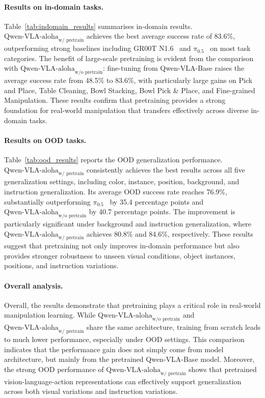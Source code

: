 \documentclass{article}
\begin{document}
    \paragraph{Results on in-domain tasks.}
        Table~\ref{tab:indomain_results} summarises in-domain results.
    ${\text{Qwen-VLA-aloha}}_{\text{w/ pretrain}}$ achieves the best average success rate of 83.6\%, outperforming strong baselines including GR00T N1.6~\citep{nvidia2025gr00t} and $\pi_{0.5}$~\citep{black2025pi05} on most task categories.
    The benefit of large-scale pretraining is evident from the comparison with
    ${\text{Qwen-VLA-aloha}}_{\text{w/o pretrain}}$:
    fine-tuning from Qwen-VLA-Base raises the average success rate from 48.5\% to 83.6\%, with particularly large gains on Pick and Place, Table Cleaning, Bowl Stacking, Bowl Pick \& Place, and Fine-grained Manipulation.
    These results confirm that pretraining provides a strong foundation for real-world manipulation that transfers effectively across diverse in-domain tasks.

    
    
    \paragraph{Results on OOD tasks.}
    Table~\ref{tab:ood_results} reports the OOD generalization performance. ${\text{Qwen-VLA-aloha}}_{\text{w/ pretrain}}$ consistently achieves the best results across all five generalization settings, including color, instance, position, background, and instruction generalization. Its average OOD success rate reaches 76.9\%, substantially outperforming $\pi_{0.5}$~\citep{black2025pi05} by 35.4 percentage points and ${\text{Qwen-VLA-aloha}}_{\text{w/o pretrain}}$ by 40.7 percentage points. The improvement is particularly significant under background and instruction generalization, where ${\text{Qwen-VLA-aloha}}_{\text{w/ pretrain}}$ achieves 80.8\% and 84.6\%, respectively. These results suggest that pretraining not only improves in-domain performance but also provides stronger robustness to unseen visual conditions, object instances, positions, and instruction variations.
    
    \paragraph{Overall analysis.}
    Overall, the results demonstrate that pretraining plays a critical role in real-world manipulation learning. While ${\text{Qwen-VLA-aloha}}_{\text{w/o pretrain}}$ and ${\text{Qwen-VLA-aloha}}_{\text{w/ pretrain}}$ share the same architecture, training from scratch leads to much lower performance, especially under OOD settings. This comparison indicates that the performance gain does not simply come from model architecture, but mainly from the pretrained Qwen-VLA-Base model. Moreover, the strong OOD performance of ${\text{Qwen-VLA-aloha}}_{\text{w/ pretrain}}$ shows that pretrained vision-language-action representations can effectively support generalization across both visual variations and instruction variations.
    
\end{document}
